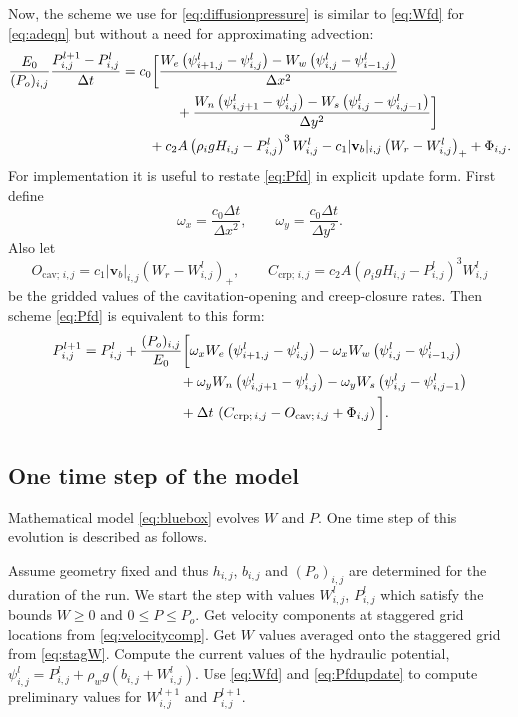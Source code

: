 \documentclass[11pt,final]{amsart}%
\newcommand\bv{\mathbf{v}}
\newcommand{\Wlij}{W^l_{i,j}}
\newcommand{\Plij}{P^l_{i,j}}
\begin{document}
Now, the scheme we use for \eqref{eq:diffusionpressure} is similar to \eqref{eq:Wfd} for \eqref{eq:adeqn} but without a need for approximating advection:
\begin{align}
\frac{E_0}{(P_o)_{i,j}} \frac{P_{i,j}^{l+1} - \Plij}{\Delta t} &= c_0 \bigg[\frac{W_e \left(\psi_{i+1,j}^l - \psi_{i,j}^l\right) - W_w \left(\psi_{i,j}^l - \psi_{i-1,j}^l\right)}{\Delta x^2}  \label{eq:Pfd} \\
      &\qquad\qquad + \frac{W_n \left(\psi_{i,j+1}^l - \psi_{i,j}^l\right) - W_s \left(\psi_{i,j}^l - \psi_{i,j-1}^l\right)}{\Delta y^2}\bigg] \notag \\
      &\qquad + c_2 A \left(\rho_i g H_{i,j}- \Plij\right)^3 \Wlij - c_1 |\bv_b|_{i,j} \left(W_r - \Wlij\right)_+ + \Phi_{i,j}. \notag
\end{align}
For implementation it is useful to restate \eqref{eq:Pfd} in explicit update form.  First define
	$$\omega_x = \frac{c_0 \Delta t}{\Delta x^2}, \qquad \omega_y = \frac{c_0 \Delta t}{\Delta y^2}.$$
Also let
\newcommand{\Ocavij}{O_{\text{cav};\, i,j}}
\newcommand{\Ccrpij}{C_{\text{crp};\, i,j}}
	$$\Ocavij = c_1 |\bv_b|_{i,j} \left(W_r - \Wlij\right)_+, \qquad \Ccrpij = c_2 A \left(\rho_i g H_{i,j} - \Plij\right)^3 \Wlij$$
be the gridded values of the cavitation-opening and creep-closure rates.  Then scheme \eqref{eq:Pfd} is equivalent to this form:
\begin{align}
P_{i,j}^{l+1} &= \Plij +  \frac{(P_o)_{i,j}}{E_0} \bigg[\omega_x W_e \left(\psi_{i+1,j}^l - \psi_{i,j}^l\right) - \omega_x W_w \left(\psi_{i,j}^l - \psi_{i-1,j}^l\right) \label{eq:Pfdupdate} \\
      &\qquad\qquad\qquad\quad + \omega_y W_n \left(\psi_{i,j+1}^l - \psi_{i,j}^l\right) - \omega_y W_s \left(\psi_{i,j}^l - \psi_{i,j-1}^l\right) \notag \\
      &\qquad\qquad\qquad\quad + \Delta t\, \left(\Ccrpij - \Ocavij + \Phi_{i,j}\right)\bigg]. \notag
\end{align}

\subsection*{One time step of the model}  Mathematical model \eqref{eq:bluebox} evolves $W$ and $P$.  One time step of this evolution is described as follows.

Assume geometry fixed and thus $h_{i,j}$, $b_{i,j}$ and $(P_o)_{i,j}$ are determined for the duration of the run.  We start the step with values $\Wlij$, $\Plij$ which satisfy the bounds $W\ge 0$ and $0 \le P \le P_o$.  Get velocity components at staggered grid locations from \eqref{eq:velocitycomp}.  Get $W$ values averaged onto the staggered grid from \eqref{eq:stagW}.  Compute the current values of the hydraulic potential, $\psi_{i,j}^l = \Plij + \rho_w g(b_{i,j} + \Wlij)$.  Use \eqref{eq:Wfd} and \eqref{eq:Pfdupdate} to compute preliminary values for $W_{i,j}^{l+1}$ and $P_{i,j}^{l+1}$.
\end{document}
